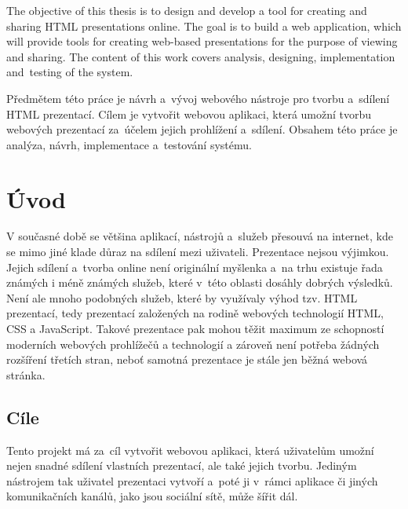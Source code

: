 \documentclass[11pt,twoside,a4paper]{book}
\begin{document}
	The objective of this thesis is to design and develop a tool for creating and sharing HTML presentations online. The goal is to build a web application, which will provide tools for creating web-based presentations for the purpose of viewing and sharing. The content of this work covers analysis, designing, implementation and~testing of the system.


	\baselineskip

	\noindent
	Předmětem této práce je návrh a~vývoj webového nástroje pro tvorbu a~sdílení HTML prezentací. Cílem je vytvořit webovou aplikaci, která umožní tvorbu webových prezentací za~účelem jejich prohlížení a~sdílení. Obsahem této práce je analýza, návrh, imple\-mentace a~testování systému.

	\tableofcontents		%

	\listoffigures			%

	\mainbodystarts



\chapter{Úvod}
V současné době se většina aplikací, nástrojů a~služeb přesouvá na internet, kde se mimo jiné klade důraz na sdílení mezi uživateli. Prezentace nejsou výjimkou. Jejich sdílení a~tvorba online není originální myšlenka a~na trhu existuje řada známých i méně známých služeb, které v~této oblasti dosáhly dobrých výsledků. Není ale mnoho podobných služeb, které by využívaly výhod tzv. HTML prezentací, tedy prezentací založených na rodině webových technologií HTML, CSS a JavaScript. Takové prezentace pak mohou těžit maximum ze schopností moderních webových prohlížečů a technologií a zároveň není potřeba žádných rozšíření třetích stran, neboť samotná prezentace je stále jen běžná webová stránka.

\section{Cíle}
Tento projekt má za~cíl vytvořit webovou aplikaci, která uživatelům umožní nejen snadné sdílení vlastních prezentací, ale také jejich tvorbu. Jediným nástrojem tak uživatel prezentaci vytvoří a~poté ji v~rámci aplikace či jiných komunikačních kanálů, jako jsou sociální sítě, může šířit dál.
\end{document}
